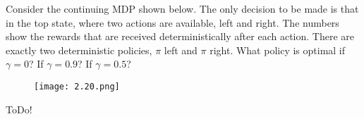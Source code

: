 
\begin{exercise}[Exercise 3.22]

Consider the continuing MDP shown below.
The only decision to be made is that in the top state, where two actions are available, left and right.
The numbers show the rewards that are received deterministically after each action.
There are exactly two deterministic policies, $\pi$ left and $\pi$ right.
What policy is optimal if $\gamma = 0$?
If $\gamma = 0.9$?
If $\gamma = 0.5$?

\begin{figure}[H]
    \centering
    \texttt{[image: 2.20.png]}
    \caption{}
    \label{fig:2.20}
\end{figure}

\end{exercise}


\begin{solution}

ToDo!

\end{solution}

